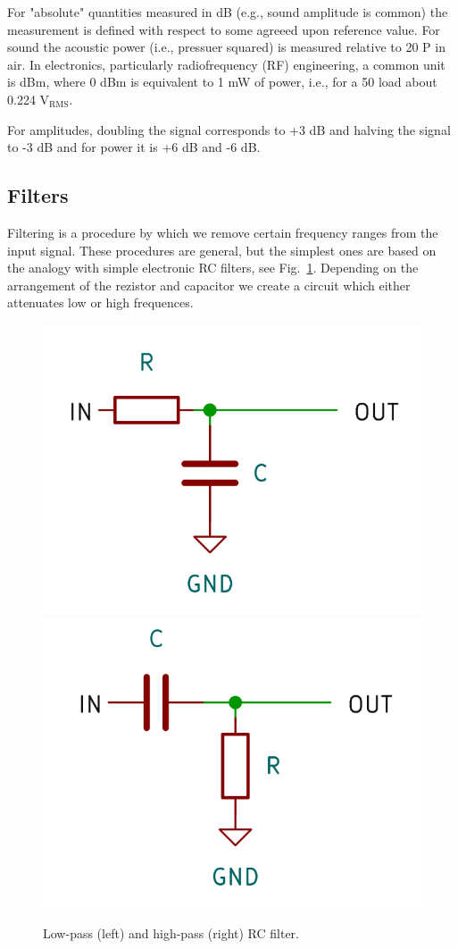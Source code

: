 \documentclass{article}
\begin{document}
For "absolute" quantities measured in dB (e.g., sound amplitude is common) the measurement is defined with respect to some agreeed upon reference value. For sound the acoustic power (i.e., pressuer squared) is measured relative to 20 \textmu P in air. In electronics, particularly radiofrequency (RF) engineering, a common unit is dBm, where 0 dBm is equivalent to 1 mW of power, i.e., for a 50 \textohm load about 0.224 V$_\mathrm{RMS}$.

For amplitudes, doubling the signal corresponds to +3 dB and halving the signal to -3 dB and for power it is +6 dB and -6 dB.

\subsection{Filters}

Filtering is a procedure by which we remove certain frequency ranges from the input signal. These procedures are general, but the simplest ones are based on the analogy with simple electronic RC filters, see Fig.~\ref{fig:RC-lowpass}. Depending on the arrangement of the rezistor and capacitor we create a circuit which either attenuates low or high frequences.
\begin{figure}
    \centering
    \includegraphics[width=0.49\linewidth]{low-pass-RC.png}%
    \includegraphics[width=0.49\linewidth]{high-pass-RC.png}%
    \label{fig:RC-lowpass}
    \caption{Low-pass (left) and high-pass (right) RC filter.}
\end{figure}
\end{document}
